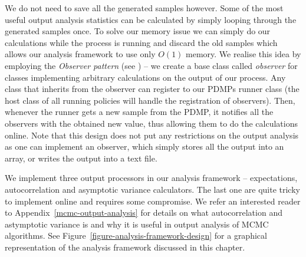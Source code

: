 \documentclass[report.tex]{subfiles}
\begin{document}
We do not need to save all the generated samples however. Some of the most useful
output analysis statistics can be calculated by simply looping through the generated samples
once. To solve our memory issue we can simply do our calculations while the process is running
and discard the old samples which allows our analysis framework to use only $O(1)$ memory.
We realise this idea by employing the \textit{Observer pattern} (see \citet{gamma1994design})
-- we create a base class called \textit{observer} for classes implementing arbitrary
calculations on the output of our process. Any class that inherits from the observer can register
to our PDMPs runner class (the host class of all running policies will handle the registration of observers).
Then, whenever the runner gets a new sample from the PDMP, it notifies all the observers
with the obtained new value, thus allowing them to do the calculations online.
Note that this design does not put any restrictions on the output analysis as one can implement
an observer, which simply stores all the output into an array, or writes the output into
a text file.

We implement three output processors in our analysis framework -- expectations, autocorrelation
and asymptotic variance calculators. The last one are quite tricky to implement online
and requires some compromise. We refer an interested reader to Appendix~\ref{mcmc-output-analysis}
for details on what autocorrelation and astymptotic variance is and why it
is useful in output analysis of MCMC algorithms.
See Figure~\ref{figure-analysis-framework-design} for a graphical representation
of the analysis framework discussed in this chapter.
\end{document}
